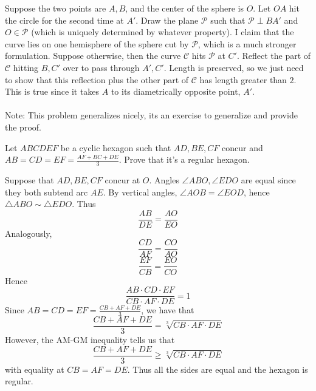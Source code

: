 \documentclass[11pt]{scrartcl}
\begin{document}
  \begin{soln}
    Suppose the two points are $A,B$, and the center of the sphere is $O$. Let $OA$ hit the circle for the second time at $A'$.
    Draw the plane $\mathcal{P}$ such that $\mathcal{P}\perp BA'$ and $O\in\mathcal{P}$ (which is uniquely determined by whatever property).
    I claim that the curve lies on one hemisphere of the sphere cut by $\mathcal{P}$, which is a much stronger formulation.
    Suppose otherwise, then the curve $\mathcal{C}$ hits $\mathcal{P}$ at $C'$. Reflect the part of $\mathcal{C}$ hitting $B,C'$ over to pass through $A',C'$.
    Length is preserved, so we just need to show that this reflection plus the other part of $\mathcal{C}$ has length greater than $2$.
    This is true since it takes $A$ to its diametrically opposite point, $A'$. \\ \\
    Note: This problem generalizes nicely, its an exercise to generalize and provide the proof.
  \end{soln}
  \begin{example}
    [Crux 4664]
    Let $ABCDEF$ be a cyclic hexagon such that $AD,BE,CF$ concur and
    $AB=CD=EF=\frac{AF+BC+DE}{3}$. Prove that it's a regular hexagon.
  \end{example}
  \begin{soln}
    Suppose that $AD,BE,CF$ concur at $O$. Angles $\angle ABO,\angle EDO$ are equal since they both subtend arc $AE$. By vertical angles, $\angle AOB=\angle EOD$, hence $\triangle ABO\sim\triangle EDO$. Thus
    $$\frac{AB}{DE}=\frac{AO}{EO}$$
    Analogously,
    $$\frac{CD}{AF}=\frac{CO}{AO}$$
    $$\frac{EF}{CB}=\frac{EO}{CO}$$
    Hence
    $$\frac{AB\cdot CD\cdot EF}{CB\cdot AF\cdot DE}=1$$
    Since $AB=CD=EF=\frac{CB+AF+DE}{3}$, we have that
    $$\frac{CB+AF+DE}{3}=\sqrt[3]{CB\cdot AF\cdot DE}$$
    However, the AM-GM inequality tells us that
    $$\frac{CB+AF+DE}{3}\ge \sqrt[3]{CB\cdot AF\cdot DE}$$
    with equality at $CB=AF=DE$. Thus all the sides are equal and the hexagon is regular.
  \end{soln}
\end{document}
